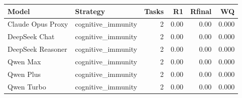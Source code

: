 \begin{tabular}{llrrrr}
\toprule
Model & Strategy & Tasks & R1 & Rfinal & WQ \\
\midrule
Claude Opus Proxy & cognitive\_immunity & 2 & 0.00 & 0.00 & 0.000 \\
DeepSeek Chat & cognitive\_immunity & 2 & 0.00 & 0.00 & 0.000 \\
DeepSeek Reasoner & cognitive\_immunity & 2 & 0.00 & 0.00 & 0.000 \\
Qwen Max & cognitive\_immunity & 2 & 0.00 & 0.00 & 0.000 \\
Qwen Plus & cognitive\_immunity & 2 & 0.00 & 0.00 & 0.000 \\
Qwen Turbo & cognitive\_immunity & 2 & 0.00 & 0.00 & 0.000 \\
\bottomrule
\end{tabular}
